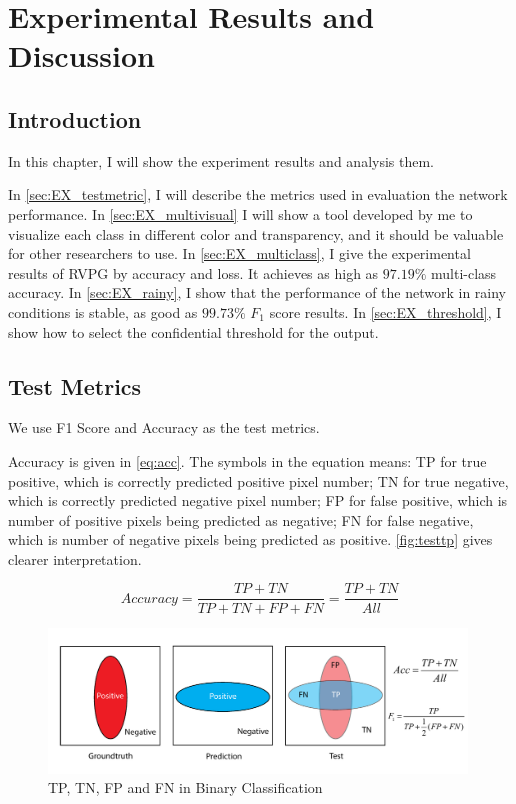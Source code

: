 
\chapter{Experimental Results and Discussion}
\label{cha:experiments}
\begin{spacing}{1.5}
\setlength{\parskip}{0.3in}

\section{Introduction}

In this chapter, I will show the experiment results and analysis them.

In \autoref{sec:EX_testmetric}, I will describe the metrics used in evaluation the network performance. In \autoref{sec:EX_multivisual} I will show a tool developed by me to visualize each class in different color and transparency, and it should be valuable for other researchers to use. In \autoref{sec:EX_multiclass}, I give the experimental results of RVPG by accuracy and loss. It achieves as high as $97.19\%$ multi-class accuracy. In \autoref{sec:EX_rainy}, I show that the performance of the network in rainy conditions is stable, as good as $99.73\%$ $F_1$ score results. In \autoref{sec:EX_threshold}, I show how to select the confidential threshold for the output.

\section{Test Metrics}
\label{sec:EX_testmetric}

We use F1 Score and Accuracy as the test metrics.

Accuracy is given in \autoref{eq:acc}. The symbols in the equation means: TP for true positive, which is correctly predicted positive pixel number; TN for true negative, which is correctly predicted negative pixel number; FP for false positive, which is number of positive pixels being predicted as negative; FN for false negative, which is number of negative pixels being predicted as positive. \autoref{fig:testtp} gives clearer interpretation.

\begin{equation}
\label{eq:acc}
    Accuracy=\frac{TP+TN}{TP+TN+FP+FN}=\frac{TP+TN}{All}
\end{equation}

\begin{figure}[ht]
\centering
\includegraphics[width=0.99\textwidth, fbox]{Chapter5/testtp.pdf}
\caption{TP, TN, FP and FN in Binary Classification}
\label{fig:testtp} 
\end{figure}


\end{spacing}
